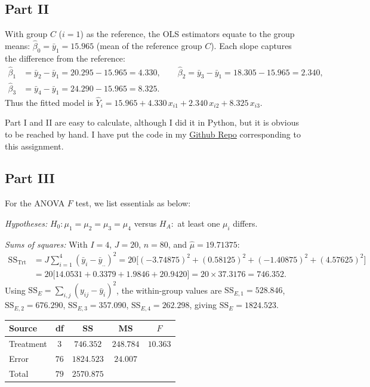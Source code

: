 \documentclass[letterpaper]{article}
\begin{document}
		\clearpage
		\subsection{Part II}
		
		With group $C$ ($i=1$) as the reference, the OLS estimators equate to the group means:
		$\hat{\beta}_0 = \bar{y}_1 = 15.965$ (mean of the reference group $C$).
		Each slope captures the difference from the reference:
		\begin{align*}
			\hat{\beta}_1 &= \bar{y}_2 - \bar{y}_1 = 20.295 - 15.965 = 4.330, \qquad
			\hat{\beta}_2  = \bar{y}_3 - \bar{y}_1 = 18.305 - 15.965 = 2.340, \\
			\hat{\beta}_3 &= \bar{y}_4 - \bar{y}_1 = 24.290 - 15.965 = 8.325.
		\end{align*}
		Thus the fitted model is
		$\hat{Y}_i = 15.965 + 4.330\,x_{i1} + 2.340\,x_{i2} + 8.325\,x_{i3}$.
		
		Part I and II are easy to calculate, although I did it in Python, but it is obvious to be reached by hand. I have put the code in my \href{https://github.com/zongyiliu/STAT_5291/tree/main/Homework/Homework_3}{Github Repo} corresponding to this assignment.
		
		\clearpage
		\subsection{Part III}
		
		For the ANOVA $F$ test, we list essentials as below:
		
		\emph{Hypotheses:}
		$H_0: \mu_1 = \mu_2 = \mu_3 = \mu_4$ versus $H_A:$ at least one $\mu_i$ differs.
		
		\emph{Sums of squares:} With $I=4$, $J=20$, $n=80$, and $\hat{\mu} = 19.71375$:
		\begin{align*}
			\mathrm{SS}_{\mathrm{Trt}}
			&= J\sum_{i=1}^{4}(\bar{y}_i - \bar{y}_{..})^2
			= 20\bigl[(-3.74875)^2 + (0.58125)^2 + (-1.40875)^2 + (4.57625)^2\bigr] \\
			&= 20\bigl[14.0531 + 0.3379 + 1.9846 + 20.9420\bigr]
			= 20 \times 37.3176 = 746.352.
		\end{align*}
		Using $\mathrm{SS}_E = \sum_{i,j}(y_{ij}-\bar{y}_i)^2$, the within-group values are
		$\mathrm{SS}_{E,1} = 528.846$, $\mathrm{SS}_{E,2} = 676.290$,
		$\mathrm{SS}_{E,3} = 357.090$, $\mathrm{SS}_{E,4} = 262.298$,
		giving $\mathrm{SS}_E = 1824.523$.
		
		\begin{center}
			\begin{tabular}{lcccc}
				\hline
				Source     & df   & SS          & MS        & $F$      \\
				\hline
				Treatment  & $3$  & $746.352$   & $248.784$ & $10.363$ \\
				Error      & $76$ & $1824.523$  & $24.007$  &          \\
				\hline
				Total      & $79$ & $2570.875$  &           &          \\
				\hline
			\end{tabular}
		\end{center}
		
\end{document}
